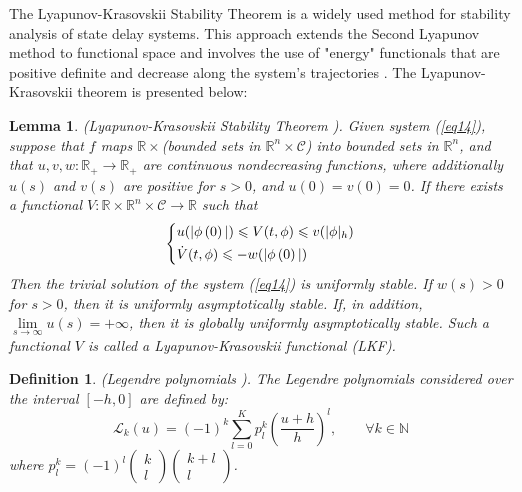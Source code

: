 \documentclass[a4paper]{cas-sc}
\newtheorem{lemma}[theorem]{Lemma}
\newtheorem{defi}[theorem]{Definition}
\begin{document}
The Lyapunov-Krasovskii Stability Theorem is a widely used method for stability analysis of state delay systems. This approach extends the Second Lyapunov method to functional space and involves the use of "energy" functionals that are positive definite and decrease along the system's trajectories \citep{Gu2003}. The Lyapunov-Krasovskii theorem is presented below:
\begin{lemma}
  \label{lemma1}
  (Lyapunov-Krasovskii Stability Theorem \citep{Gu2009}). Given system (\ref{eq14}), suppose that $f$ maps $\mathbb{R} \times  $(bounded sets in ${\mathbb{R}^n} \times \mathcal{C} $) into bounded sets in ${\mathbb{R}^n} $, and that $u,v,w:{\mathbb{R}_ + } \to {\mathbb{R}_ + } $ are continuous nondecreasing functions, where additionally $u(s) $ and $v(s) $ are positive for $s > 0 $, and $u(0) = v(0) = 0 $. If there exists a functional $V:\mathbb{R} \times {\mathbb{R}^n} \times \mathcal{C} \to \mathbb{R} $ such that
  \begin{equation}
    \left\{ \begin{gathered}
      u(|\phi \left( 0 \right)|) \leqslant V(t,\phi ) \leqslant v(|\phi {|_h}) \hfill \\
      \dot V(t,\phi ) \leqslant  - w(|\phi \left( 0 \right)|) \hfill \\
    \end{gathered}  \right.
  \end{equation}
  Then the trivial solution of the system (\ref{eq14}) is uniformly stable. If $w(s) > 0 $ for $s > 0 $, then it is uniformly asymptotically stable. If, in addition, $\mathop {\lim }\limits_{s \to \infty } u(s) =  + \infty  $, then it is globally uniformly asymptotically stable. Such a functional $V $ is called a Lyapunov-Krasovskii functional (LKF).
\end{lemma}

\begin{defi}
  (Legendre polynomials \citep{dattoli2001note}). The Legendre polynomials considered over the interval $[ - h,0]$ are defined by:
  \begin{equation}
    {\mathcal{L}_k}(u) = {( - 1)^k}\sum\limits_{l = 0}^K {p_l^k} {\left( {\frac{{u + h}}{h}} \right)^l},\quad \quad \forall k \in \mathbb{N}
  \end{equation}
  where $p_l^k = {( - 1)^l}\left( {\begin{array}{*{20}{l}}
        k \\
        l
      \end{array}} \right)\left( {\begin{array}{*{20}{c}}
        {k + l} \\
        l
      \end{array}} \right)$.
\end{defi}
\end{document}
